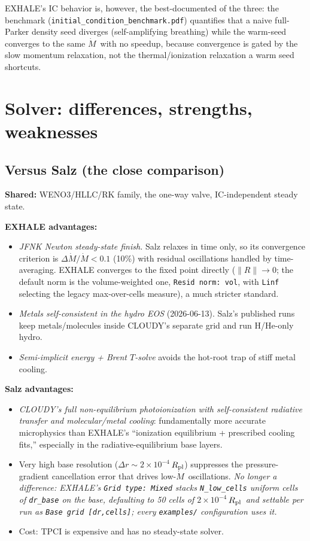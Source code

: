 \documentclass[english,a4paper]{my_memo}
\newcommand{\Rp}{$R_{\rm pl}$}
\newcommand{\Mdot}{$\dot M$}
\begin{document}
EXHALE's IC behavior is, however, the best-documented of the three: the
benchmark
(\texttt{initial\_\allowbreak condition\_\allowbreak benchmark.pdf})
quantifies that a
naive full-Parker density seed diverges (self-amplifying breathing)
while the warm-seed converges to the same \Mdot\ with no speedup,
because convergence is gated by the slow momentum relaxation, not the
thermal/ionization relaxation a warm seed shortcuts.

\section{Solver: differences, strengths, weaknesses}

\subsection{Versus Salz (the close comparison)}

\textbf{Shared:} WENO3/HLLC/RK family, the one-way valve, IC-independent
steady state.

\textbf{EXHALE advantages:}
\begin{itemize}
\item \emph{JFNK Newton steady-state finish.} Salz relaxes in time only,
  so its convergence criterion is $\Delta\dot M/\dot M<0.1$ (10\%) with
  residual oscillations handled by time-averaging. EXHALE converges to
  the fixed point directly ($\|R\|\to0$; the default norm is the
  volume-weighted one, \texttt{Resid norm: vol}, with \texttt{Linf}
  selecting the legacy max-over-cells measure), a much stricter
  standard.
\item \emph{Metals self-consistent in the hydro EOS} (2026-06-13). Salz's
  published runs keep metals/molecules inside CLOUDY's separate grid and
  run H/He-only hydro.
\item \emph{Semi-implicit energy + Brent $T$-solve} avoids the hot-root
  trap of stiff metal cooling.
\end{itemize}

\textbf{Salz advantages:}
\begin{itemize}
\item \emph{CLOUDY's full non-equilibrium photoionization with
  self-consistent radiative transfer and molecular/metal cooling}:
  fundamentally more accurate microphysics than EXHALE's ``ionization
  equilibrium + prescribed cooling fits,'' especially in the
  radiative-equilibrium base layers.
\item Very high base resolution ($\Delta r\sim2{\times}10^{-4}$\,\Rp)
  suppresses the pressure-gradient cancellation error that drives
  low-\Mdot\ oscillations. \emph{No longer a difference: EXHALE's
  \texttt{Grid type: Mixed} stacks \texttt{N\_low\_cells} uniform cells of
  \texttt{dr\_base} on the base, defaulting to 50 cells of
  $2\times10^{-4}$\,\Rp\ and settable per run as
  \texttt{Base grid [dr,cells]}; every \texttt{examples/} configuration uses
  it.}
\item Cost: TPCI is expensive and has no steady-state solver.
\end{itemize}
\end{document}
